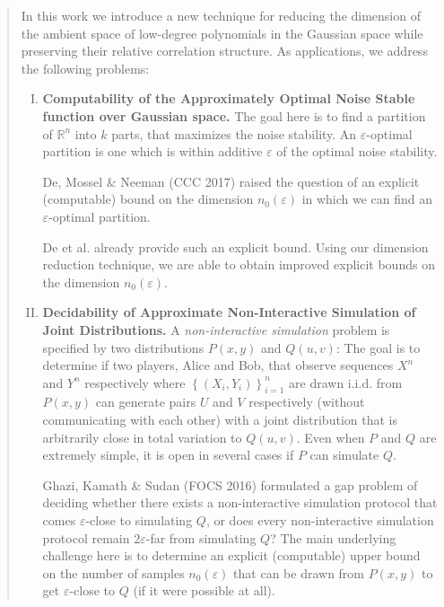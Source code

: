 \documentclass[11pt]{article}
\newcommand{\inbrace}[1]{\left \{ #1 \right \}}
\newcommand{\set}[1]{\inbrace{#1}}
\newcommand{\eps}{\varepsilon}
\newcommand{\bbR}{{\mathbb R}}
\begin{document}
\begin{abstract}
	In this work we introduce a new technique for reducing the dimension of the ambient space of low-degree polynomials in the Gaussian space while preserving their relative correlation structure. As applications, we address the following problems:
	
	\begin{enumerate}[(I)]
		\item {\bf Computability of the Approximately Optimal Noise Stable function over Gaussian space.} The goal here is to find a partition of $\bbR^n$ into $k$ parts, that maximizes the noise stability. An $\eps$-optimal partition is one which is within additive $\eps$ of the optimal noise stability.
		
		De, Mossel \& Neeman (CCC 2017) raised the question of an explicit (computable) bound on the dimension $n_0(\eps)$ in which we can find an $\eps$-optimal partition.
		
		De et al. already provide such an explicit bound. Using our dimension reduction technique, we are able to obtain improved explicit bounds on the dimension $n_0(\eps)$.
		
		\item {\bf Decidability of Approximate Non-Interactive Simulation of Joint Distributions.} A {\em non-interactive simulation} problem is specified by two distributions $P(x,y)$ and $Q(u,v)$: The goal is to determine if two players, Alice and Bob, that observe sequences $X^n$ and $Y^n$ respectively where $\set{(X_i, Y_i)}_{i=1}^n$ are drawn i.i.d. from $P(x,y)$ can generate pairs $U$ and $V$ respectively  (without communicating with each other) with a joint distribution that is arbitrarily close in total variation to $Q(u,v)$. Even when $P$ and $Q$ are extremely simple, it is open in several cases if $P$ can simulate $Q$.%
		
		Ghazi, Kamath \& Sudan (FOCS 2016) formulated a gap problem of deciding whether there exists a non-interactive simulation protocol that comes $\eps$-close to simulating $Q$, or does every non-interactive simulation protocol remain $2\eps$-far from simulating $Q$? The main underlying challenge here is to determine an explicit (computable) upper bound on the number of samples $n_0(\eps)$ that can be drawn from $P(x,y)$ to get $\eps$-close to $Q$ (if it were possible at all).
		

\end{enumerate}
\end{abstract}
\end{document}
